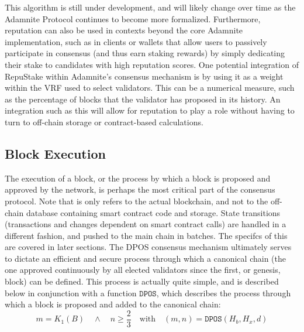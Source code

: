 \documentclass[conference]{IEEEtran}
\begin{document}
This algorithm is still under development, and will likely change over time as the Adamnite Protocol continues to become more formalized. Furthermore, reputation can also be used in contexts beyond the core Adamnite implementation, such as in clients or wallets that allow users to passively participate in consensus (and thus earn staking rewards) by simply dedicating their stake to candidates with high reputation scores. One potential integration of RepuStake within Adamnite's consensus mechanism is by using it as a weight within the VRF used to select validators. This can be a numerical measure, such as the percentage of blocks that the validator has proposed in its history. An integration such as this will allow for reputation to play a role without having to turn to off-chain storage or contract-based calculations.

\subsection{Block Execution}

The execution of a block, or the process by which a block is proposed and approved by the network, is perhaps the most critical part of the consensus protocol. Note that is only refers to the actual blockchain, and not to the off-chain database containing smart contract code and storage. State transitions (transactions and changes dependent on smart contract calls) are handled in a different fashion, and pushed to the main chain in batches. The specifcs of this are covered in later sections. The DPOS consensus mechanism ultimately serves to dictate an efficient and secure process through which a canonical chain (the one approved continuously by all elected validators since the first, or genesis, block) can be defined. This process is actually quite simple, and is described below in conjunction with a function $\mathtt{DPOS}$, which describes the process through which a block is proposed and added to the canonical chain:
\begin{equation}
    m = {K_1(B)} \quad \wedge \quad n \ge \frac{2}{3} \quad
\text{with} \quad (m,n) = \mathtt{DPOS}(H_b,H_x,d) \end{equation}
\end{document}
